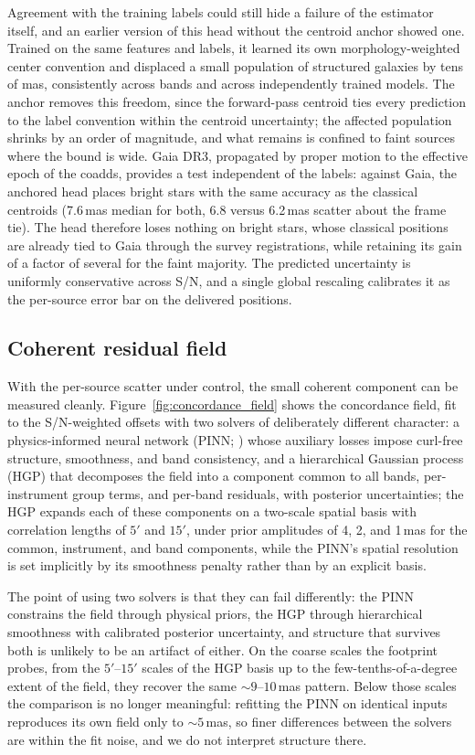 \documentclass[twocolumn,linenumbers]{aastex701}
\begin{document}
Agreement with the training labels could still hide a failure of the estimator itself, and an earlier version of this head without the centroid anchor showed one. Trained on the same features and labels, it learned its own morphology-weighted center convention and displaced a small population of structured galaxies by tens of mas, consistently across bands and across independently trained models. The anchor removes this freedom, since the forward-pass centroid ties every prediction to the label convention within the centroid uncertainty; the affected population shrinks by an order of magnitude, and what remains is confined to faint sources where the bound is wide. Gaia DR3, propagated by proper motion to the effective epoch of the coadds, provides a test independent of the labels: against Gaia, the anchored head places bright stars with the same accuracy as the classical centroids (7.6\,mas median for both, 6.8 versus 6.2\,mas scatter about the frame tie). The head therefore loses nothing on bright stars, whose classical positions are already tied to Gaia through the survey registrations, while retaining its gain of a factor of several for the faint majority. The predicted uncertainty is uniformly conservative across S/N, and a single global rescaling calibrates it as the per-source error bar on the delivered positions.


\subsection{Coherent residual field}

With the per-source scatter under control, the small coherent component can be measured cleanly. Figure~\ref{fig:concordance_field} shows the concordance field, fit to the S/N-weighted offsets with two solvers of deliberately different character: a physics-informed neural network (PINN; \citealt{PINN}) whose auxiliary losses impose curl-free structure, smoothness, and band consistency, and a hierarchical Gaussian process (HGP) that decomposes the field into a component common to all bands, per-instrument group terms, and per-band residuals, with posterior uncertainties; the HGP expands each of these components on a two-scale spatial basis with correlation lengths of $5'$ and $15'$, under prior amplitudes of 4, 2, and 1\,mas for the common, instrument, and band components, while the PINN's spatial resolution is set implicitly by its smoothness penalty rather than by an explicit basis.

The point of using two solvers is that they can fail differently: the PINN constrains the field through physical priors, the HGP through hierarchical smoothness with calibrated posterior uncertainty, and structure that survives both is unlikely to be an artifact of either. On the coarse scales the footprint probes, from the $5'$--$15'$ scales of the HGP basis up to the few-tenths-of-a-degree extent of the field, they recover the same ${\sim}9$--$10$\,mas pattern. Below those scales the comparison is no longer meaningful: refitting the PINN on identical inputs reproduces its own field only to ${\sim}5$\,mas, so finer differences between the solvers are within the fit noise, and we do not interpret structure there.
\end{document}
